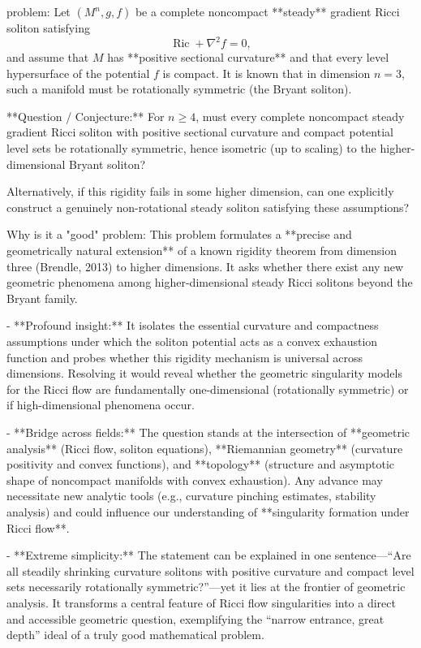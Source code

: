 problem:  
Let \((M^n,g,f)\) be a complete noncompact **steady** gradient Ricci soliton satisfying  
\[
\operatorname{Ric} + \nabla^2 f = 0,
\]
and assume that \(M\) has **positive sectional curvature** and that every level hypersurface of the potential \(f\) is compact.  
It is known that in dimension \(n=3\), such a manifold must be rotationally symmetric (the Bryant soliton).  

**Question / Conjecture:**  
For \(n \ge 4\), must every complete noncompact steady gradient Ricci soliton with positive sectional curvature and compact potential level sets be rotationally symmetric, hence isometric (up to scaling) to the higher-dimensional Bryant soliton?  

Alternatively, if this rigidity fails in some higher dimension, can one explicitly construct a genuinely non-rotational steady soliton satisfying these assumptions?  

Why is it a "good" problem:  
This problem formulates a **precise and geometrically natural extension** of a known rigidity theorem from dimension three (Brendle, 2013) to higher dimensions. It asks whether there exist any new geometric phenomena among higher-dimensional steady Ricci solitons beyond the Bryant family.  

- **Profound insight:** It isolates the essential curvature and compactness assumptions under which the soliton potential acts as a convex exhaustion function and probes whether this rigidity mechanism is universal across dimensions. Resolving it would reveal whether the geometric singularity models for the Ricci flow are fundamentally one-dimensional (rotationally symmetric) or if high-dimensional phenomena occur.  

- **Bridge across fields:** The question stands at the intersection of **geometric analysis** (Ricci flow, soliton equations), **Riemannian geometry** (curvature positivity and convex functions), and **topology** (structure and asymptotic shape of noncompact manifolds with convex exhaustion). Any advance may necessitate new analytic tools (e.g., curvature pinching estimates, stability analysis) and could influence our understanding of **singularity formation under Ricci flow**.  

- **Extreme simplicity:** The statement can be explained in one sentence—“Are all steadily shrinking curvature solitons with positive curvature and compact level sets necessarily rotationally symmetric?”—yet it lies at the frontier of geometric analysis. It transforms a central feature of Ricci flow singularities into a direct and accessible geometric question, exemplifying the “narrow entrance, great depth” ideal of a truly good mathematical problem.